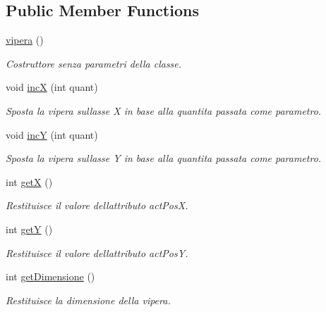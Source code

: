 \subsection*{Public Member Functions}
\begin{DoxyCompactItemize}
\item 
\mbox{\hyperlink{class_snake_1_1game_1_1vipera_1_1vipera_abc78413b68a8d6a8a17953932195b06f}{vipera}} ()
\begin{DoxyCompactList}\small\item\em Costruttore senza parametri della classe. \end{DoxyCompactList}\item 
void \mbox{\hyperlink{class_snake_1_1game_1_1vipera_1_1vipera_ab776bb3430d4d6d0a27bb94ae74ee07c}{incX}} (int quant)
\begin{DoxyCompactList}\small\item\em Sposta la vipera sull\textquotesingle{}asse X in base alla quantita passata come parametro. \end{DoxyCompactList}\item 
void \mbox{\hyperlink{class_snake_1_1game_1_1vipera_1_1vipera_a51a16845a66091ec0697d9ccf8ba4e8d}{incY}} (int quant)
\begin{DoxyCompactList}\small\item\em Sposta la vipera sull\textquotesingle{}asse Y in base alla quantita passata come parametro. \end{DoxyCompactList}\item 
int \mbox{\hyperlink{class_snake_1_1game_1_1vipera_1_1vipera_ae13f88e922e1339355456062ad9fa359}{getX}} ()
\begin{DoxyCompactList}\small\item\em Restituisce il valore dell\textquotesingle{}attributo act\+PosX. \end{DoxyCompactList}\item 
int \mbox{\hyperlink{class_snake_1_1game_1_1vipera_1_1vipera_aab81944f0a14bba932c0931899951937}{getY}} ()
\begin{DoxyCompactList}\small\item\em Restituisce il valore dell\textquotesingle{}attributo act\+PosY. \end{DoxyCompactList}\item 
int \mbox{\hyperlink{class_snake_1_1game_1_1vipera_1_1vipera_acda812adf1e0abdaf30cf3a2e2efaa07}{get\+Dimensione}} ()
\begin{DoxyCompactList}\small\item\em Restituisce la dimensione della vipera. \end{DoxyCompactList}\item 

\end{DoxyCompactItemize}
